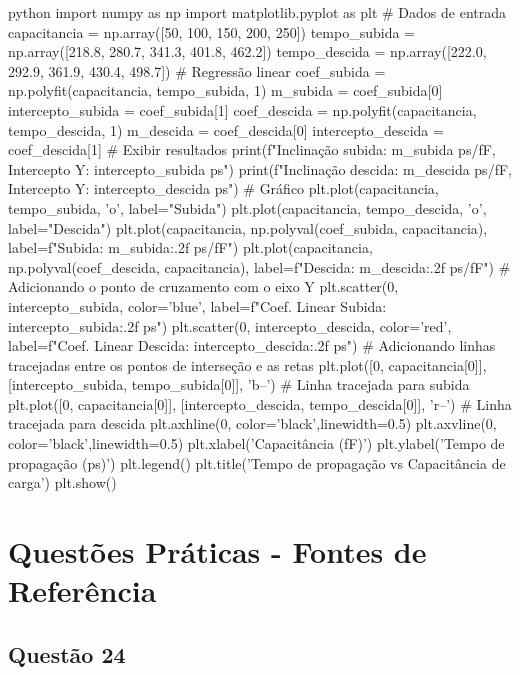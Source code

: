 \documentclass[12pt,a4paper]{article}
\begin{document}
\begin{codeblockm}{python}
import numpy as np
import matplotlib.pyplot as plt
# Dados de entrada
capacitancia = np.array([50, 100, 150, 200, 250])
tempo_subida = np.array([218.8, 280.7, 341.3, 401.8, 462.2])
tempo_descida = np.array([222.0, 292.9, 361.9, 430.4, 498.7])
# Regressão linear
coef_subida = np.polyfit(capacitancia, tempo_subida, 1)
m_subida = coef_subida[0]
intercepto_subida = coef_subida[1]
coef_descida = np.polyfit(capacitancia, tempo_descida, 1)
m_descida = coef_descida[0]
intercepto_descida = coef_descida[1]
# Exibir resultados
print(f"Inclinação subida: {m_subida} ps/fF, Intercepto Y: {intercepto_subida} ps")
print(f"Inclinação descida: {m_descida} ps/fF, Intercepto Y: {intercepto_descida} ps")
# Gráfico
plt.plot(capacitancia, tempo_subida, 'o', label="Subida")
plt.plot(capacitancia, tempo_descida, 'o', label="Descida")
plt.plot(capacitancia, np.polyval(coef_subida, capacitancia),
label=f"Subida: {m_subida:.2f} ps/fF")
plt.plot(capacitancia, np.polyval(coef_descida, capacitancia),
label=f"Descida: {m_descida:.2f} ps/fF")
# Adicionando o ponto de cruzamento com o eixo Y
plt.scatter(0, intercepto_subida, color='blue', label=f"Coef. Linear Subida: {intercepto_subida:.2f} ps")
plt.scatter(0, intercepto_descida, color='red', label=f"Coef. Linear Descida: {intercepto_descida:.2f} ps")
# Adicionando linhas tracejadas entre os pontos de interseção e as retas
plt.plot([0, capacitancia[0]], [intercepto_subida, tempo_subida[0]], 'b--')
# Linha tracejada para subida
plt.plot([0, capacitancia[0]], [intercepto_descida, tempo_descida[0]],
'r--') # Linha tracejada para descida
plt.axhline(0, color='black',linewidth=0.5)
plt.axvline(0, color='black',linewidth=0.5)
plt.xlabel('Capacitância (fF)')
plt.ylabel('Tempo de propagação (ps)')
plt.legend()
plt.title('Tempo de propagação vs Capacitância de carga')
plt.show()
\end{codeblockm}

\newpage

\section*{Questões Práticas - Fontes de Referência}

\subsection*{Questão 24}
\end{document}
